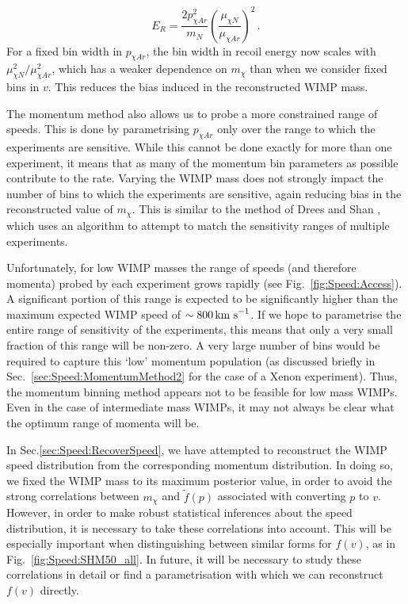 \begin{equation}
E_R = \frac{2 p_{\chi Ar}^2}{m_N} \left(\frac{\mu_{\chi N}}{\mu_{\chi Ar}}\right)^2\,.
\end{equation}
For a fixed bin width in $p_{\chi Ar}$, the bin width in recoil energy now scales with $\mu_{\chi N}^2/ \mu_{\chi Ar}^2$, which has a weaker dependence on $m_\chi$ than when we consider fixed bins in $v$. This reduces the bias induced in the reconstructed WIMP mass.

The momentum method also allows us to probe a more constrained range of speeds. This is done by parametrising $p_{\chi Ar}$ only over the range to which the experiments are sensitive. While this cannot be done exactly for more than one experiment, it means that as many of the momentum bin parameters as possible contribute to the rate. Varying the WIMP mass does not strongly impact the number of bins to which the experiments are sensitive, again reducing bias in the reconstructed value of $m_\chi$. This is similar to the method of Drees and Shan \cite{Drees:2008}, which uses an algorithm to attempt to match the sensitivity ranges of multiple experiments.

Unfortunately, for low WIMP masses the range of speeds (and therefore momenta) probed by each experiment grows rapidly (see Fig.~\ref{fig:Speed:Access}). A significant portion of this range is expected to be significantly higher than the maximum expected WIMP speed of $\sim 800 \,\textrm{km s}^{-1}$. If we hope to parametrise the entire range of sensitivity of the experiments, this means that only a very small fraction of this range will be non-zero. A very large number of bins would be required to capture this `low' momentum population (as discussed briefly in Sec.~\ref{sec:Speed:MomentumMethod2} for the case of a Xenon experiment). Thus, the momentum binning method appears not to be feasible for low mass WIMPs. Even in the case of intermediate mass WIMPs, it may not always be clear what the optimum range of momenta will be.

In Sec.\ref{sec:Speed:RecoverSpeed}, we have attempted to reconstruct the WIMP speed distribution from the corresponding momentum distribution. In doing so, we fixed the WIMP mass to its maximum posterior value, in order to avoid the strong correlations between $m_\chi$ and $\tilde{f}(p)$ associated with converting $p$ to $v$. However, in order to make robust statistical inferences about the speed distribution, it is necessary to take these correlations into account. This will be especially important when distinguishing between similar forms for $f(v)$, as in Fig.~\ref{fig:Speed:SHM50_all}. In future, it will be necessary to study these correlations in detail or find a parametrisation with which we can reconstruct $f(v)$ directly.

